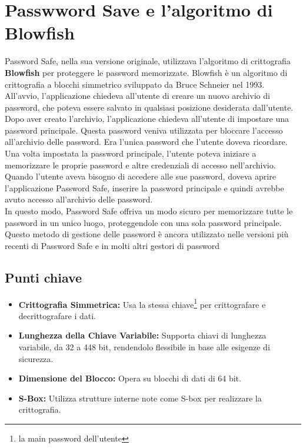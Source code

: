 \documentclass[a4paper,12pt]{report}
\begin{document}
		\section{Passwword Save e l'algoritmo di Blowfish}
		Password Safe, nella sua versione originale, utilizzava l'algoritmo di
		crittografia \textbf{Blowfish} per proteggere le password memorizzate.
		Blowfish è un algoritmo di crittografia a blocchi simmetrico sviluppato da
		Bruce Schneier nel 1993.\\
		All'avvio, l'applicazione chiedeva all'utente di creare un nuovo archivio di
		password, che poteva essere salvato in qualsiasi posizione desiderata
		dall'utente. Dopo aver creato l'archivio, l'applicazione chiedeva all'utente di
		impostare una password principale. Questa password veniva utilizzata per
		bloccare l'accesso all'archivio delle password. Era l'unica password che
		l'utente doveva ricordare.\\
		Una volta impostata la password principale, l'utente poteva iniziare a
		memorizzare le proprie password e altre credenziali di accesso nell'archivio.
		Quando l'utente aveva bisogno di accedere alle sue password, doveva aprire
		l'applicazione Password Safe, inserire la password principale e quindi avrebbe
		avuto accesso all'archivio delle password.\\
		In questo modo, Password Safe offriva un modo sicuro per memorizzare tutte le
		password in un unico luogo, proteggendole con una sola password principale.
		Questo metodo di gestione delle password è ancora utilizzato nelle versioni più
		recenti di Password Safe e in molti altri gestori di password
		\subsection*{Punti chiave}
		\begin{itemize}
			\item \textbf{Crittografia Simmetrica:} Usa la stessa chiave\footnote{ la main password dell'utente} per
			crittografare e decrittografare i dati.
			\item \textbf{Lunghezza della Chiave Variabile:} Supporta chiavi di
			lunghezza variabile, da 32 a 448 bit, rendendolo flessibile in base alle
			esigenze di sicurezza.
			\item \textbf{Dimensione del Blocco:} Opera su blocchi di dati di 64
			bit.
			\item \textbf{S-Box:} Utilizza strutture interne note come
			S-box per realizzare la crittografia.
		\end{itemize}
		\newpage
\end{document}
